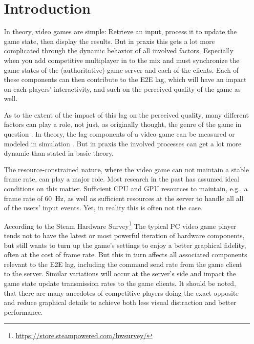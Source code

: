 
\section{Introduction}

In theory, video games are simple: Retrieve an input, process it to update the game state, then display the results. But in praxis this gets a lot more complicated through the dynamic behavior of all involved factors. Especially when you add competitive multiplayer in to the mix and must synchronize the game states of the (authoritative) game server and each of the clients. Each of these components can then contribute to the \gls{E2E} lag, which will have an impact on each players' interactivity, and such on the perceived quality of the game as well\cite{Claypool:2006:LPA:1167838.1167860,7965676}. 

As to the extent of the impact of this lag on the perceived quality, many different factors can play a role, not just, as originally thought, the genre of the game in question \cite{mollertowards,Slivar:2016:CGQ:2910017.2910602}. In theory, the lag components of a video game can be measured \cite{7148095} or modeled in simulation \cite{Metzger+2016}. But in praxis the involved processes can get a lot more dynamic than stated in basic theory. 

The resource-constrained nature, where the video game can not maintain a stable frame rate, can play a major role. Most research in the past has assumed ideal conditions on this matter. Sufficient CPU and GPU resources to maintain, e.g., a frame rate of \SI{60}{\hertz}, as well as sufficient resources at the server to handle all all of the users' input events. Yet, in reality this is often not the case. 

According to the Steam Hardware Survey\footnote{\url{https://store.steampowered.com/hwsurvey/}} The typical PC video game player tends not to have the latest or most powerful iteration of hardware components, but still wants to turn up the game's settings to enjoy a better graphical fidelity, often at the cost of frame rate. But this in turn affects all associated components relevant to the \gls{E2E} lag, including the command send rate from the game client to the server. Similar variations will occur at the server's side and impact the game state update transmission rates to the game clients. It should be noted, that there are many anecdotes of competitive players doing the exact opposite and reduce graphical details to achieve both less visual distraction and better performance.

